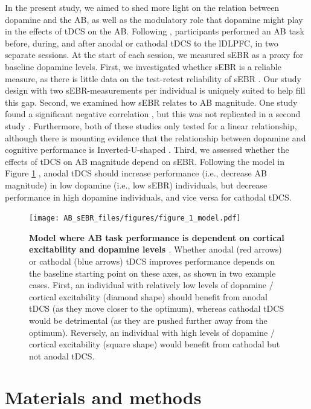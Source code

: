 \documentclass[11pt,english,]{memoir}
\begin{document}
In the present study, we aimed to shed more light on the relation between dopamine and the AB, as well as the modulatory role that dopamine might play in the effects of tDCS on the AB. Following \textcite{London2015}, participants performed an AB task before, during, and after anodal or cathodal tDCS to the lDLPFC, in two separate sessions. At the start of each session, we measured sEBR as a proxy for baseline dopamine levels. First, we investigated whether sEBR is a reliable measure, as there is little data on the test-retest reliability of sEBR \autocite{Jongkees2016}. Our study design with two sEBR-measurements per individual is uniquely suited to help fill this gap. Second, we examined how sEBR relates to AB magnitude. One study found a significant negative correlation \autocite{Colzato2008}, but this was not replicated in a second study \autocite{Slagter2013}. Furthermore, both of these studies only tested for a linear relationship, although there is mounting evidence that the relationship between dopamine and cognitive performance is Inverted-U-shaped \autocite{Cools2011}. Third, we assessed whether the effects of tDCS on AB magnitude depend on sEBR. Following the model in Figure \ref{fig:AB-sEBR-fig-model} \autocites{Krause2013}{London2015}{Wiegand2016}, anodal tDCS should increase performance (i.e., decrease AB magnitude) in low dopamine (i.e., low sEBR) individuals, but decrease performance in high dopamine individuals, and vice versa for cathodal tDCS.

\begin{figure}
\centering
\texttt{[image: AB\_sEBR\_files/figures/figure\_1\_model.pdf]}
\caption{\label{fig:AB-sEBR-fig-model}\textbf{Model where AB task performance is dependent on cortical excitability \autocite[left,][]{London2015} and dopamine levels \autocite[right,][]{Wiegand2016}}. Whether anodal (red arrows) or cathodal (blue arrows) tDCS improves performance depends on the baseline starting point on these axes, as shown in two example cases. First, an individual with relatively low levels of dopamine / cortical excitability (diamond shape) should benefit from anodal tDCS (as they move closer to the optimum), whereas cathodal tDCS would be detrimental (as they are pushed further away from the optimum). Reversely, an individual with high levels of dopamine / cortical excitability (square shape) would benefit from cathodal but not anodal tDCS.}
\end{figure}



\hypertarget{AB_sEBR-methods}{%
\section{Materials and methods}\label{AB_sEBR-methods}}
\end{document}
